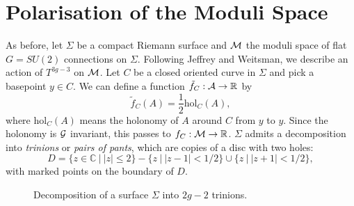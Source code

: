 \section{Polarisation of the Moduli Space}	
	As before, let $\Sigma$ be a compact Riemann surface and $\mathcal{M}$ the moduli space of flat $G=SU(2)$ connections on $\Sigma$. Following Jeffrey and Weitsman, we describe an action of $T^{3g-3}$ on $\mathcal{M}$. Let $C$ be a closed oriented curve in $\Sigma$ and pick a basepoint $y\in C$. We can define a function $\tilde{f}_C:\mathcal{A} \to \mathbb{R}$ by 
	\begin{equation}
		\tilde{f}_C(A) = \frac{1}{2}\text{hol}_C(A),
	\end{equation}
	where hol$_C(A)$ means the holonomy of $A$ around $C$ from $y$ to $y$. Since the holonomy is $\mathcal{G}$ invariant, this passes to $f_C:\mathcal{M} \to \mathbb{R}$. $\Sigma$ admits a decomposition into \textit{trinions} or \textit{pairs of pants}, which are copies of a disc with two holes:
	\begin{equation}
		D = \{z \in \mathbb{C}~|~ |z|\leq 2 \} - \{z~|~|z-1|<1/2\}\cup \{z~|~ |z+1| < 1/2\},
	\end{equation}
	with marked points on the boundary of $D$. 

	\begin{figure}[h]
		\centering
		\caption{Decomposition of a surface $\Sigma$ into $2g-2$ trinions. }
		\label{fig:torusdecomp}
	\end{figure}

